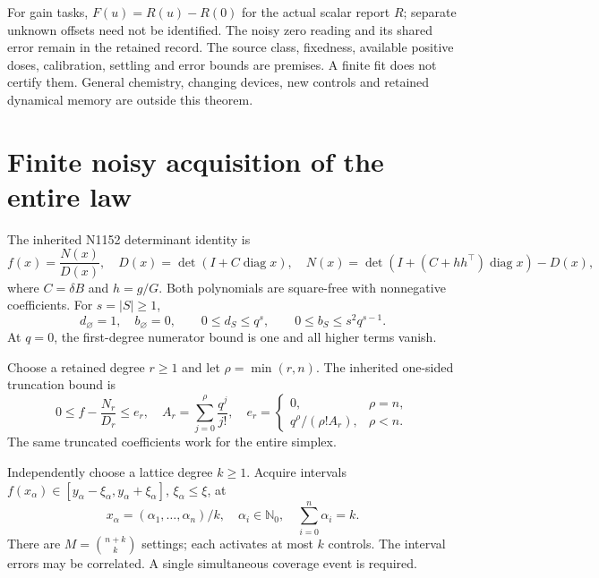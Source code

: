 \documentclass[10pt,a4paper]{article}
\begin{document}
For gain tasks, $F(u)=R(u)-R(0)$ for the actual scalar report $R$; separate
unknown offsets need not be identified. The noisy zero reading and its shared
error remain in the retained record. The source class, fixedness, available
positive doses, calibration, settling and error bounds are premises. A finite
fit does not certify them. General chemistry, changing devices, new controls
and retained dynamical memory are outside this theorem.

\section{Finite noisy acquisition of the entire law}

The inherited N1152 determinant identity is
\begin{equation}
 f(x)=\frac{N(x)}{D(x)},\quad
 D(x)=\det(I+C\operatorname{diag}x),\quad
 N(x)=\det(I+(C+hh^\top)\operatorname{diag}x)-D(x),
\end{equation}
where $C=\delta B$ and $h=g/G$. Both polynomials are square-free with
nonnegative coefficients. For $s=|S|\ge1$,
\begin{equation}
 d_\varnothing=1,\quad b_\varnothing=0,\qquad
 0\le d_S\le q^s,\qquad 0\le b_S\le s^2q^{s-1}.
 \label{eq:boxes}
\end{equation}
At $q=0$, the first-degree numerator bound is one and all higher terms vanish.

Choose a retained degree $r\ge1$ and let $\rho=\min(r,n)$. The inherited
one-sided truncation bound is
\begin{equation}
 0\le f-\frac{N_r}{D_r}\le e_r,\quad
 A_r=\sum_{j=0}^{\rho}\frac{q^j}{j!},\quad
 e_r=\begin{cases}0,&\rho=n,\\q^\rho/(\rho! A_r),&\rho<n.\end{cases}
 \label{eq:tail}
\end{equation}
The same truncated coefficients work for the entire simplex.

Independently choose a lattice degree $k\ge1$. Acquire intervals
$f(x_\alpha)\in[y_\alpha-\xi_\alpha,y_\alpha+\xi_\alpha]$,
$\xi_\alpha\le\xi$, at
\begin{equation}
 x_\alpha=(\alpha_1,\ldots,\alpha_n)/k,\quad
 \alpha_i\in\mathbb N_0,\quad\sum_{i=0}^n\alpha_i=k.
\end{equation}
There are $M=\binom{n+k}{k}$ settings; each activates at most $k$ controls.
The interval errors may be correlated. A single simultaneous coverage event
is required.
\end{document}
